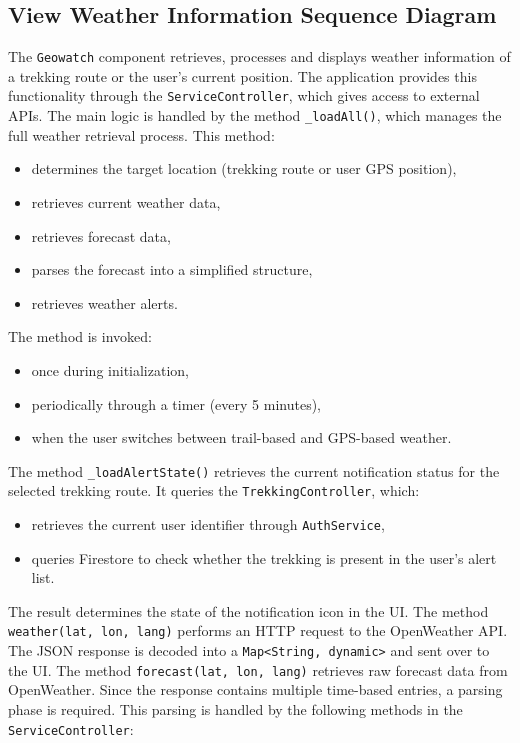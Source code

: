 \newpage
\subsection{View Weather Information Sequence Diagram}
\label{View Weather Information Sequence Diagram}
The \texttt{Geowatch} component retrieves, processes and displays weather information of a trekking route or the user’s current position. The application provides this functionality through the \texttt{ServiceController}, which gives access to external APIs.
The main logic is handled by the method \texttt{\_loadAll()}, which manages the full weather retrieval process. This method:
\begin{itemize}
    \item determines the target location (trekking route or user GPS position),
    \item retrieves current weather data,
    \item retrieves forecast data,
    \item parses the forecast into a simplified structure,
    \item retrieves weather alerts.
\end{itemize} 
The method is invoked:








\begin{itemize}
    \item once during initialization,
    \item periodically through a timer (every 5 minutes),
    \item when the user switches between trail-based and GPS-based weather.
\end{itemize}
The method \texttt{\_loadAlertState()} retrieves the current notification status for the selected trekking route. It queries the \texttt{TrekkingController}, which:

\begin{itemize}
    \item retrieves the current user identifier through \texttt{AuthService},
    \item queries Firestore to check whether the trekking is present in the user’s alert list.
\end{itemize}
The result determines the state of the notification icon in the UI.
The method \texttt{weather(lat, lon, lang)} performs an HTTP request to the OpenWeather API. The JSON response is decoded into a \texttt{Map<String, dynamic>} and sent over to the UI.
The method \texttt{forecast(lat, lon, lang)} retrieves raw forecast data from OpenWeather. Since the response contains multiple time-based entries, a parsing phase is required.
This parsing is handled by the following methods in the \texttt{ServiceController}:










